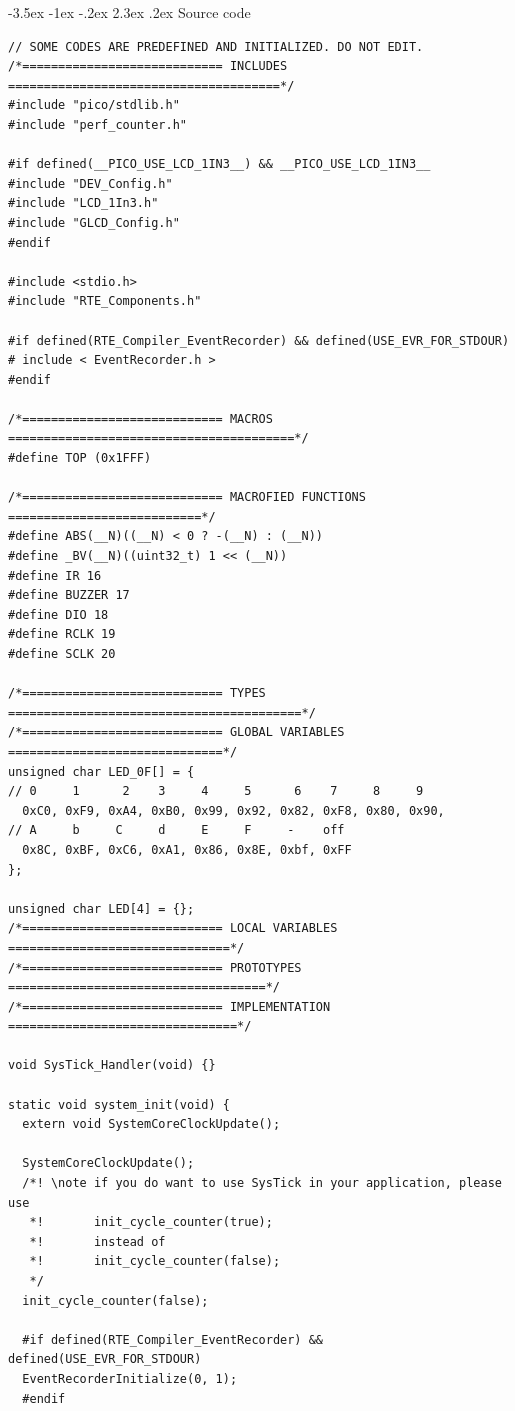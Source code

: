 \documentclass[13pt,a4paper,twoside]{report}
\makeatletter
\renewcommand\section{\@startsection {section}{1}{-1em}%
  {-3.5ex \@plus -1ex \@minus -.2ex}%
  {2.3ex \@plus.2ex}%
  {\normalfont\Large\bfseries}}
\makeatother
\begin{document}
\section{Source code}
\begin{verbatim}
// SOME CODES ARE PREDEFINED AND INITIALIZED. DO NOT EDIT.
/*============================ INCLUDES ======================================*/
#include "pico/stdlib.h"
#include "perf_counter.h"

#if defined(__PICO_USE_LCD_1IN3__) && __PICO_USE_LCD_1IN3__
#include "DEV_Config.h"
#include "LCD_1In3.h"
#include "GLCD_Config.h"
#endif

#include <stdio.h>
#include "RTE_Components.h"

#if defined(RTE_Compiler_EventRecorder) && defined(USE_EVR_FOR_STDOUR)
# include < EventRecorder.h >
#endif

/*============================ MACROS ========================================*/
#define TOP	(0x1FFF)

/*============================ MACROFIED FUNCTIONS ===========================*/
#define ABS(__N)((__N) < 0 ? -(__N) : (__N))
#define _BV(__N)((uint32_t) 1 << (__N))
#define IR 16
#define BUZZER 17
#define DIO 18
#define RCLK 19
#define SCLK 20

/*============================ TYPES =========================================*/
/*============================ GLOBAL VARIABLES ==============================*/
unsigned char LED_0F[] = {
// 0     1      2    3     4     5      6    7     8     9
  0xC0, 0xF9, 0xA4, 0xB0, 0x99, 0x92, 0x82, 0xF8, 0x80, 0x90, 
// A     b     C     d     E     F     -    off
  0x8C, 0xBF, 0xC6, 0xA1, 0x86, 0x8E, 0xbf, 0xFF
};

unsigned char LED[4] = {};
/*============================ LOCAL VARIABLES ===============================*/
/*============================ PROTOTYPES ====================================*/
/*============================ IMPLEMENTATION ================================*/

void SysTick_Handler(void) {}

static void system_init(void) {
  extern void SystemCoreClockUpdate();

  SystemCoreClockUpdate();
  /*! \note if you do want to use SysTick in your application, please use 
   *!       init_cycle_counter(true); 
   *!       instead of 
   *!       init_cycle_counter(false); 
   */
  init_cycle_counter(false);

  #if defined(RTE_Compiler_EventRecorder) && defined(USE_EVR_FOR_STDOUR)
  EventRecorderInitialize(0, 1);
  #endif


\end{verbatim}
\end{document}
